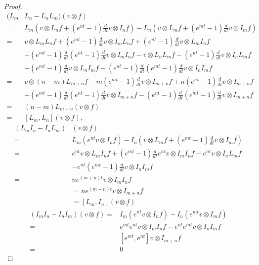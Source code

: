 \documentclass[a4paper]{amsart}
\numberwithin{equation}{section}
\begin{document}
\begin{proof}
\begin{align*}
(L_{m}&L_{n}-L_{n}L_{m})(v\otimes f)\\
=&L_{m}(v\otimes L_{n}f+(e^{nt}-1)\tfrac{d}{dt}v\otimes I_{n}f)-L_{n}(v\otimes L_{m}f+(e^{mt}-1)\tfrac{d}{dt}v\otimes I_{m}f)\\
=&v\otimes L_{m}L_{n}f+(e^{mt}-1)\tfrac{d}{dt}v\otimes I_{m}L_{n}f+(e^{nt}-1)\tfrac{d}{dt}v\otimes L_{m}I_{n}f\\
&+(e^{mt}-1)\tfrac{d}{dt}(e^{nt}-1)\tfrac{d}{dt}v\otimes I_{m}I_{n}f-v\otimes L_{n}L_{m}f-(e^{nt}-1)\tfrac{d}{dt}v\otimes I_{n}L_{m}f\\
&-(e^{mt}-1)\tfrac{d}{dt}v\otimes L_{n}I_{m}f-(e^{nt}-1)\tfrac{d}{dt}(e^{mt}-1)\tfrac{d}{dt}v\otimes I_{n}I_{m}f\\
=&v\otimes(n-m)L_{m+n}f-m(e^{mt}-1)\tfrac{d}{dt}v\otimes I_{m+n}f+n(e^{nt}-1)\tfrac{d}{dt}v\otimes I_{m+n}f\\
&+(e^{mt}-1)\tfrac{d}{dt}(e^{nt}-1)\tfrac{d}{dt}v\otimes I_{m+n}f-(e^{nt}-1)\tfrac{d}{dt}(e^{mt}-1)\tfrac{d}{dt}v\otimes I_{m+n}f\\
    =&(n-m)L_{m+n}(v\otimes f)\\
    =&[L_{m},L_{n}](v\otimes f),   
\end{align*}
\begin{align*}
    (L_{m}I_{n}-I_{n}L_{m})&(v\otimes f)\\
    =&L_{m}(e^{nt}v\otimes I_{n}f)-I_{n}(v\otimes L_{m}f+(e^{mt}-1)\tfrac{d}{dt}v\otimes I_{m}f)\\
    =&e^{nt}v\otimes L_{m}I_{n}f+(e^{mt}-1)\tfrac{d}{dt}e^{nt}v\otimes I_{m}I_{n}f-e^{nt}v\otimes I_{n}L_{m}f\\
    &-e^{nt}(e^{mt}-1)\tfrac{d}{dt}v\otimes I_{n}I_{m}f\\
    =&ne^{(m+n)t}v\otimes I_{m}I_{n}f\\
    &=ne^{(m+n)t}v\otimes I_{m+n}f\\
    &=[L_{m},I_{n}](v\otimes f)
\end{align*}
\begin{align*}
    (I_{m}I_{n}-I_{n}I_{m})(v\otimes f)
    =&I_{m}(e^{nt}v\otimes I_{n}f)-I_{n}(e^{mt}v\otimes I_{m}f)\\
    =&e^{mt}e^{nt}v\otimes I_{m}I_{n}f-e^{nt}e^{mt}v\otimes I_{n}I_{m}f\\
    =&[e^{mt},e^{nt}]v\otimes I_{m+n}f    \\
    =&0
\end{align*}
\end{proof}
\end{document}
